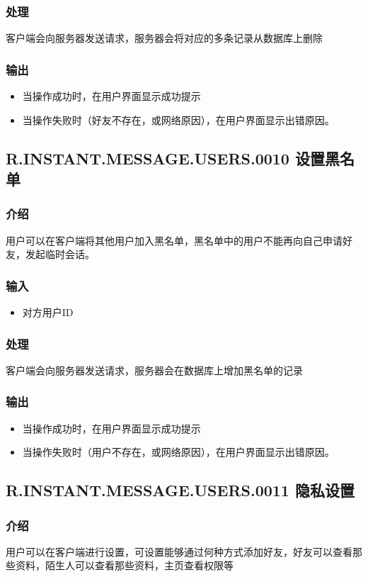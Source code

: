 {\subsubsection{处理}
客户端会向服务器发送请求，服务器会将对应的多条记录从数据库上删除
\subsubsection{输出}
\begin{itemize}
	\item 当操作成功时，在用户界面显示成功提示
	\item 当操作失败时（好友不存在，或网络原因），在用户界面显示出错原因。
\end{itemize}

\subsection{R.INSTANT.MESSAGE.USERS.0010 设置黑名单}
\subsubsection{介绍}
用户可以在客户端将其他用户加入黑名单，黑名单中的用户不能再向自己申请好友，发起临时会话。
\subsubsection{输入}
\begin{itemize}
	\item 对方用户ID
\end{itemize}
\subsubsection{处理}
客户端会向服务器发送请求，服务器会在数据库上增加黑名单的记录
\subsubsection{输出}
\begin{itemize}
	\item 当操作成功时，在用户界面显示成功提示
	\item 当操作失败时（用户不存在，或网络原因），在用户界面显示出错原因。
\end{itemize}

\subsection{R.INSTANT.MESSAGE.USERS.0011 隐私设置}
\subsubsection{介绍}
用户可以在客户端进行设置，可设置能够通过何种方式添加好友，好友可以查看那些资料，陌生人可以查看那些资料，主页查看权限等
}

